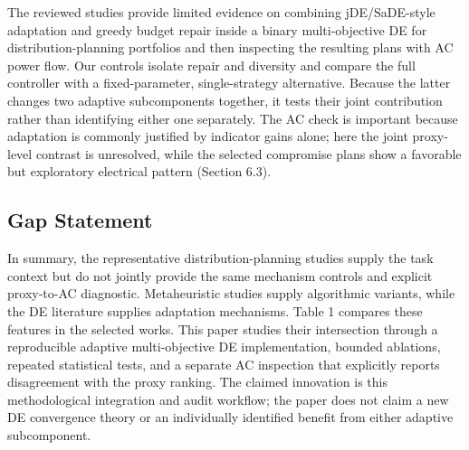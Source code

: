 \documentclass[energies,article,submit,moreauthors]{Definitions/mdpi}
\begin{document}
The reviewed studies provide limited evidence on combining jDE/SaDE-style adaptation and greedy budget repair inside a binary multi-objective DE for distribution-planning portfolios and then inspecting the resulting plans with AC power flow. Our controls isolate repair and diversity and compare the full controller with a fixed-parameter, single-strategy alternative. Because the latter changes two adaptive subcomponents together, it tests their joint contribution rather than identifying either one separately. The AC check is important because adaptation is commonly justified by indicator gains alone; here the joint proxy-level contrast is unresolved, while the selected compromise plans show a favorable but exploratory electrical pattern (Section 6.3).

\subsection{Gap Statement}\label{gap-statement}

In summary, the representative distribution-planning studies supply the task context but do not jointly provide the same mechanism controls and explicit proxy-to-AC diagnostic. Metaheuristic studies supply algorithmic variants, while the DE literature supplies adaptation mechanisms. Table 1 compares these features in the selected works. This paper studies their intersection through a reproducible adaptive multi-objective DE implementation, bounded ablations, repeated statistical tests, and a separate AC inspection that explicitly reports disagreement with the proxy ranking. The claimed innovation is this methodological integration and audit workflow; the paper does not claim a new DE convergence theory or an individually identified benefit from either adaptive subcomponent.
\end{document}
